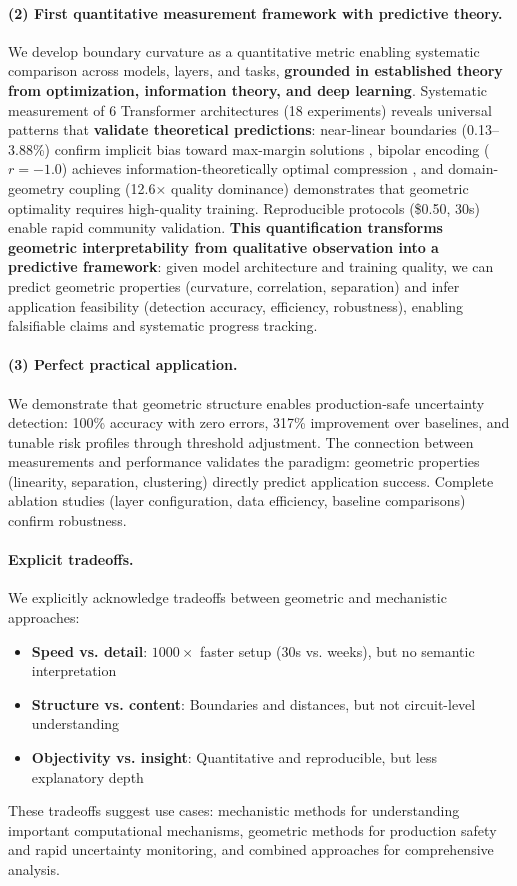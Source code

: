 \documentclass[11pt]{article}
\begin{document}
\paragraph{(2) First quantitative measurement framework with predictive theory.} We develop boundary curvature as a quantitative metric enabling systematic comparison across models, layers, and tasks, \textbf{grounded in established theory from optimization, information theory, and deep learning}. Systematic measurement of 6 Transformer architectures (18 experiments) reveals universal patterns that \textbf{validate theoretical predictions}: near-linear boundaries (0.13--3.88\%) confirm implicit bias toward max-margin solutions \citep{soudry2018implicit}, bipolar encoding ($r=-1.0$) achieves information-theoretically optimal compression \citep{tishby2015deep}, and domain-geometry coupling (12.6$\times$ quality dominance) demonstrates that geometric optimality requires high-quality training. Reproducible protocols (\$0.50, 30s) enable rapid community validation. \textbf{This quantification transforms geometric interpretability from qualitative observation into a predictive framework}: given model architecture and training quality, we can predict geometric properties (curvature, correlation, separation) and infer application feasibility (detection accuracy, efficiency, robustness), enabling falsifiable claims and systematic progress tracking.

\paragraph{(3) Perfect practical application.} We demonstrate that geometric structure enables production-safe uncertainty detection: 100\% accuracy with zero errors, 317\% improvement over baselines, and tunable risk profiles through threshold adjustment. The connection between measurements and performance validates the paradigm: geometric properties (linearity, separation, clustering) directly predict application success. Complete ablation studies (layer configuration, data efficiency, baseline comparisons) confirm robustness.

\paragraph{Explicit tradeoffs.} We explicitly acknowledge tradeoffs between geometric and mechanistic approaches:
\begin{itemize}
\item \textbf{Speed vs. detail}: $1000\times$ faster setup (30s vs. weeks), but no semantic interpretation
\item \textbf{Structure vs. content}: Boundaries and distances, but not circuit-level understanding
\item \textbf{Objectivity vs. insight}: Quantitative and reproducible, but less explanatory depth
\end{itemize}
These tradeoffs suggest use cases: mechanistic methods for understanding important computational mechanisms, geometric methods for production safety and rapid uncertainty monitoring, and combined approaches for comprehensive analysis.
\end{document}
